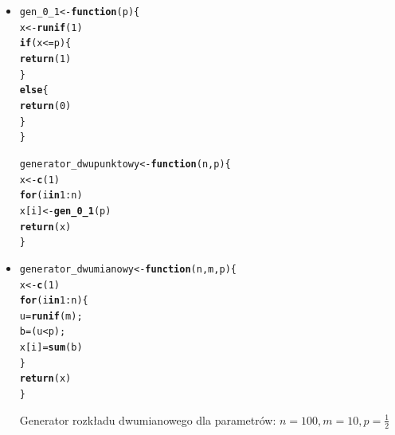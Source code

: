 \documentclass[12pt, a4paper]{article}\usepackage[]{graphicx}\usepackage[]{xcolor}
\makeatletter
\newcommand{\hlnum}[1]{\textcolor[rgb]{0.686,0.059,0.569}{#1}}%
\newcommand{\hlopt}[1]{\textcolor[rgb]{0,0,0}{#1}}%
\newcommand{\hlstd}[1]{\textcolor[rgb]{0.345,0.345,0.345}{#1}}%
\newcommand{\hlkwa}[1]{\textcolor[rgb]{0.161,0.373,0.58}{\textbf{#1}}}%
\newcommand{\hlkwb}[1]{\textcolor[rgb]{0.69,0.353,0.396}{#1}}%
\newcommand{\hlkwc}[1]{\textcolor[rgb]{0.333,0.667,0.333}{#1}}%
\newcommand{\hlkwd}[1]{\textcolor[rgb]{0.737,0.353,0.396}{\textbf{#1}}}%
\newenvironment{kframe}{%
 \def\at@end@of@kframe{}%
 \ifinner\ifhmode%
  \def\at@end@of@kframe{\end{minipage}}%
  \begin{minipage}{\columnwidth}%
 \fi\fi%
 \def\FrameCommand##1{\hskip\@totalleftmargin \hskip-\fboxsep
 \colorbox{shadecolor}{##1}\hskip-\fboxsep
     \hskip-\linewidth \hskip-\@totalleftmargin \hskip\columnwidth}%
 \MakeFramed {\advance\hsize-\width
   \@totalleftmargin\z@ \linewidth\hsize
   \@setminipage}}%
 {\par\unskip\endMakeFramed%
 \at@end@of@kframe}
\newenvironment{knitrout}{}{} %
\makeatother
\begin{document}
\begin{itemize}

\item
\begin{knitrout}
\color{fgcolor}\begin{kframe}
\begin{alltt}
\hlstd{gen_0_1} \hlkwb{<-} \hlkwa{function}\hlstd{(}\hlkwc{p}\hlstd{) \{}
  \hlstd{x} \hlkwb{<-} \hlkwd{runif}\hlstd{(}\hlnum{1}\hlstd{)}
  \hlkwa{if}\hlstd{(x} \hlopt{<=} \hlstd{p)\{}
    \hlkwd{return}\hlstd{(}\hlnum{1}\hlstd{)}
  \hlstd{\}}
  \hlkwa{else}\hlstd{\{}
    \hlkwd{return}\hlstd{(}\hlnum{0}\hlstd{)}
  \hlstd{\}}
\hlstd{\}}

\hlstd{generator_dwupunktowy} \hlkwb{<-} \hlkwa{function}\hlstd{(}\hlkwc{n}\hlstd{,}\hlkwc{p}\hlstd{)\{}
  \hlstd{x} \hlkwb{<-} \hlkwd{c}\hlstd{(}\hlnum{1}\hlstd{)}
  \hlkwa{for} \hlstd{(i} \hlkwa{in} \hlnum{1}\hlopt{:}\hlstd{n)}
    \hlstd{x[i]} \hlkwb{<-} \hlkwd{gen_0_1}\hlstd{(p)}
  \hlkwd{return}\hlstd{(x)}
\hlstd{\}}
\end{alltt}
\end{kframe}
\end{knitrout}

\item
\begin{knitrout}
\color{fgcolor}\begin{kframe}
\begin{alltt}
\hlstd{generator_dwumianowy} \hlkwb{<-} \hlkwa{function}\hlstd{(}\hlkwc{n}\hlstd{,} \hlkwc{m}\hlstd{,} \hlkwc{p}\hlstd{) \{}
  \hlstd{x} \hlkwb{<-} \hlkwd{c}\hlstd{(}\hlnum{1}\hlstd{)}
  \hlkwa{for} \hlstd{(i} \hlkwa{in} \hlnum{1}\hlopt{:}\hlstd{n) \{}
    \hlstd{u} \hlkwb{=} \hlkwd{runif}\hlstd{(m);}
    \hlstd{b} \hlkwb{=} \hlstd{(u} \hlopt{<} \hlstd{p);}
    \hlstd{x[i]} \hlkwb{=} \hlkwd{sum}\hlstd{(b)}
  \hlstd{\}}
  \hlkwd{return}\hlstd{(x)}
\hlstd{\}}
\end{alltt}
\end{kframe}
\end{knitrout}

\break
Generator rozkładu dwumianowego dla parametrów: $n=100, m=10, p=\frac{1}{2}$
\begin{knitrout}
\color{fgcolor}


\end{knitrout}
\end{itemize}
\end{document}
